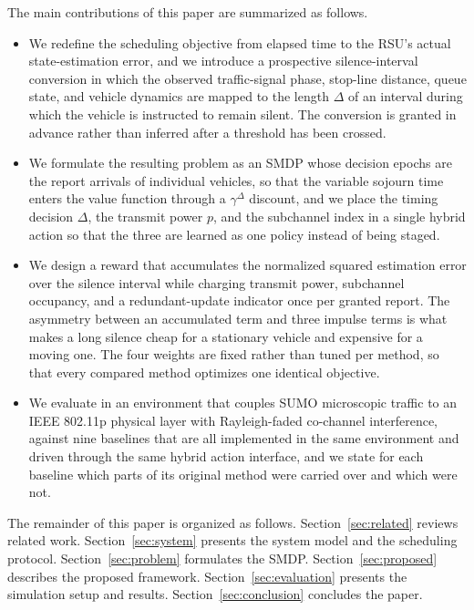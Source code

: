 \documentclass[journal]{IEEEtran}
\begin{document}
The main contributions of this paper are summarized as follows.
\begin{itemize}
    \item We redefine the scheduling objective from elapsed time to the RSU's actual state-estimation error, and we introduce a prospective silence-interval conversion in which the observed traffic-signal phase, stop-line distance, queue state, and vehicle dynamics are mapped to the length $\Delta$ of an interval during which the vehicle is instructed to remain silent. The conversion is granted in advance rather than inferred after a threshold has been crossed.
    \item We formulate the resulting problem as an SMDP whose decision epochs are the report arrivals of individual vehicles, so that the variable sojourn time enters the value function through a $\gamma^{\Delta}$ discount, and we place the timing decision $\Delta$, the transmit power $p$, and the subchannel index in a single hybrid action so that the three are learned as one policy instead of being staged.
    \item We design a reward that accumulates the normalized squared estimation error over the silence interval while charging transmit power, subchannel occupancy, and a redundant-update indicator once per granted report. The asymmetry between an accumulated term and three impulse terms is what makes a long silence cheap for a stationary vehicle and expensive for a moving one. The four weights are fixed rather than tuned per method, so that every compared method optimizes one identical objective.
    \item We evaluate in an environment that couples SUMO microscopic traffic to an IEEE 802.11p physical layer with Rayleigh-faded co-channel interference, against nine baselines that are all implemented in the same environment and driven through the same hybrid action interface, and we state for each baseline which parts of its original method were carried over and which were not.
\end{itemize}

The remainder of this paper is organized as follows. Section~\ref{sec:related} reviews related work. Section~\ref{sec:system} presents the system model and the scheduling protocol. Section~\ref{sec:problem} formulates the SMDP. Section~\ref{sec:proposed} describes the proposed framework. Section~\ref{sec:evaluation} presents the simulation setup and results. Section~\ref{sec:conclusion} concludes the paper.
\end{document}
